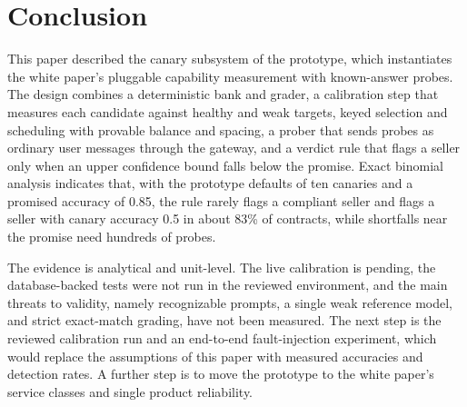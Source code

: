 \section{Conclusion}
\label{sec:conclusion}

This paper described the canary subsystem of the \Noesis{} prototype, which
instantiates the white paper's pluggable capability measurement with
known-answer probes. The design combines a deterministic bank and grader, a
calibration step that measures each candidate against healthy and weak targets,
keyed selection and scheduling with provable balance and spacing, a prober that
sends probes as ordinary user messages through the gateway, and a verdict rule
that flags a seller only when an upper confidence bound falls below the
promise. Exact binomial analysis indicates that, with the prototype defaults of
ten canaries and a promised accuracy of 0.85, the rule rarely flags a compliant
seller and flags a seller with canary accuracy 0.5 in about 83\% of contracts,
while shortfalls near the promise need hundreds of probes.

The evidence is analytical and unit-level. The live calibration is pending, the
database-backed tests were not run in the reviewed environment, and the main
threats to validity, namely recognizable prompts, a single weak reference
model, and strict exact-match grading, have not been measured. The next step is
the reviewed calibration run and an end-to-end fault-injection experiment, which
would replace the assumptions of this paper with measured accuracies and
detection rates. A further step is to move the prototype to the white
paper's service classes and single product reliability.
